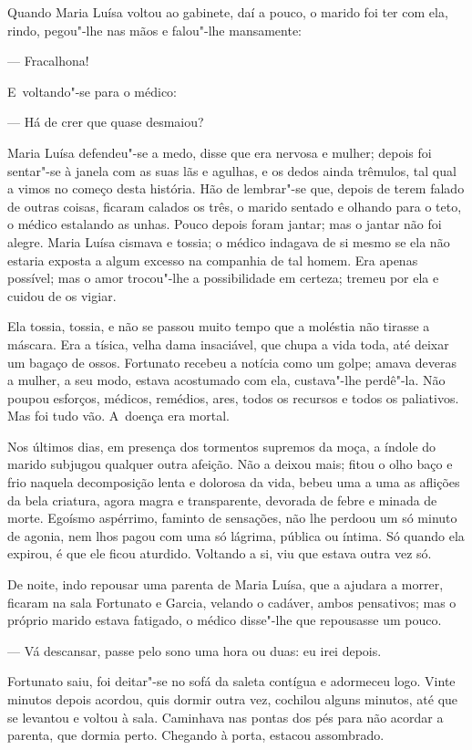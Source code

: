 \begin{linenumbers}
Quando Maria Luísa voltou ao gabinete, daí a pouco, o marido foi ter com
ela, rindo, pegou"-lhe nas mãos e falou"-lhe mansamente:

--- Fracalhona!

E~voltando"-se para o médico:

--- Há de crer que quase desmaiou?

Maria Luísa defendeu"-se a medo, disse que era nervosa e mulher; depois
foi sentar"-se à janela com as suas lãs e agulhas, e os dedos ainda
trêmulos, tal qual a vimos no começo desta história. Hão de lembrar"-se
que, depois de terem falado de outras coisas, ficaram calados os três, o
marido sentado e olhando para o teto, o médico estalando as unhas. Pouco
depois foram jantar; mas o jantar não foi alegre. Maria Luísa cismava e
tossia; o médico indagava de si mesmo se ela não estaria exposta a algum
excesso na companhia de tal homem. Era apenas possível; mas o amor
trocou"-lhe a possibilidade em certeza; tremeu por ela e cuidou de os
vigiar.

Ela tossia, tossia, e não se passou muito tempo que a moléstia não
tirasse a máscara. Era a tísica, velha dama insaciável, que chupa a vida
toda, até deixar um bagaço de ossos. Fortunato recebeu a notícia como um
golpe; amava deveras a mulher, a seu modo, estava acostumado com ela,
custava"-lhe perdê"-la. Não poupou esforços, médicos, remédios, ares,
todos os recursos e todos os paliativos. Mas foi tudo vão. A~doença era
mortal.

Nos últimos dias, em presença dos tormentos supremos da moça, a índole
do marido subjugou qualquer outra afeição. Não a deixou mais; fitou o
olho baço e frio naquela decomposição lenta e dolorosa da vida, bebeu
uma a uma as aflições da bela criatura, agora magra e transparente,
devorada de febre e minada de morte. Egoísmo aspérrimo, faminto de
sensações, não lhe perdoou um só minuto de agonia, nem lhos pagou com
uma só lágrima, pública ou íntima. Só quando ela expirou, é que ele
ficou aturdido. Voltando a si, viu que estava outra vez só.

De noite, indo repousar uma parenta de Maria Luísa, que a ajudara a
morrer, ficaram na sala Fortunato e Garcia, velando o cadáver, ambos
pensativos; mas o próprio marido estava fatigado, o médico disse"-lhe que
repousasse um pouco.

--- Vá descansar, passe pelo sono uma hora ou duas: eu irei depois.

Fortunato saiu, foi deitar"-se no sofá da saleta contígua e adormeceu
logo. Vinte minutos depois acordou, quis dormir outra vez, cochilou
alguns minutos, até que se levantou e voltou à sala. Caminhava nas
pontas dos pés para não acordar a parenta, que dormia perto. Chegando à
porta, estacou assombrado.


\end{linenumbers}
